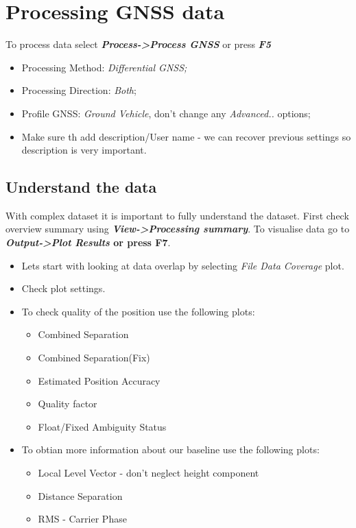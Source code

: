 \documentclass[11pt,fleqn]{book} %
\begin{document}
\section{Processing GNSS data}\label{sec:GPS-process}

To process data select \textbf{\emph{Process->Process GNSS}} or press \textbf{\emph{F5}}

\begin{itemize}
	\item Processing Method: \emph{Differential GNSS;}
	\item Processing Direction: \emph{Both};
	\item Profile GNSS: \emph{Ground Vehicle}, don't change any \emph{Advanced..}
	options;
	\item Make sure th add description/User name - we can recover previous settings so description is very important.
\end{itemize}


\subsection{Understand the data}

With complex dataset it is important to fully understand the dataset. First check overview summary using \textbf{\emph{View->Processing summary}}. To visualise data go to \textbf{\emph{Output->Plot Results} or press \textbf{F7}}.

\begin{itemize}
	\item Lets start with looking at data overlap by selecting\emph{ File Data Coverage} plot. 
	\item Check plot settings.
	\item To check quality of the position use the following plots:
	\begin{itemize}
		\item Combined Separation
		\item Combined Separation(Fix)
		\item Estimated Position Accuracy
		\item Quality factor
		\item Float/Fixed Ambiguity Status
\end{itemize}
	\item To obtian more information about our baseline use the following plots:
	\begin{itemize}
		\item Local Level Vector - don't neglect height component
		\item Distance Separation
		\item RMS - Carrier Phase
	\end{itemize}
\end{itemize}
\end{document}
